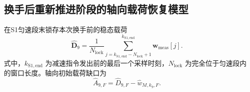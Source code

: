 \documentclass{JQR_LaTeX_Template-0507/JQRnew}
\begin{document}
\begin{figure}[H]
\centering
{}
\label{fig2}
\end{figure}

\subsection{换手后重新推进阶段的轴向载荷恢复模型}

在S1匀速段末锁存本次换手前的稳态载荷
\begin{equation}
\label{eq:lock}
\widehat{\bm D}_9=\frac{1}{N_{\mathrm{lock}}}
\sum_{j=k_{\mathrm{S1,end}}-N_{\mathrm{lock}}+1}^{k_{\mathrm{S1,end}}}
\bm w_{\mathrm{meas}}[j].
\end{equation}
式中，$k_{\mathrm{S1,end}}$ 为减速指令发出前的最后一个采样时刻，$N_{\mathrm{lock}}$ 为完全位于匀速段内的窗口长度。轴向初始载荷缺口为
\begin{equation}
\label{eq:deficit}
\widehat A_{9,F}=\widehat D_{9,F}-\widehat w_{M,k_9,F}.
\end{equation}
\end{document}
